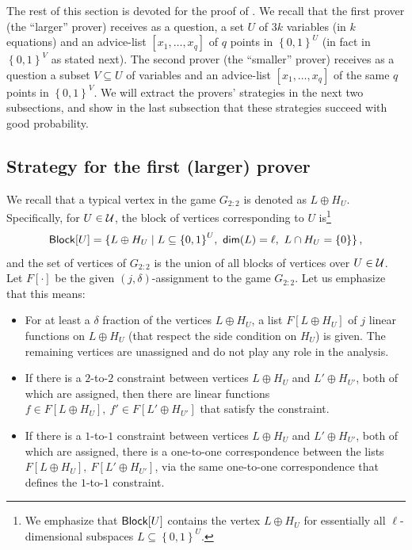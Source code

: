 \documentclass{toc}
\newcommand\set[1]{{\left\{ #1 \right\}}}
\newcommand\power[1]{\set{0,1}^{#1}}
\newcommand*\xor{\mathbin{\oplus}}
\begin{document}
The rest of this section is devoted for the proof of .
We recall that the first prover (the ``larger'' prover) receives as a question, a set $U$ of $3k$ variables (in $k$ equations) and an advice-list
$[x_1, \ldots, x_q]$ of $q$ points in $\power{U}$ (in fact in $\power{V}$ as stated next). The second prover (the ``smaller'' prover) receives as a question a subset
$V \subseteq U$ of variables and an advice-list $[x_1, \ldots, x_q]$ of the same $q$ points in $\power{V}$. We will extract the provers' strategies in
the next two subsections, and show in the last subsection that these strategies succeed with good probability.





\subsection{Strategy for the first (larger) prover }
We recall that a typical vertex in the game $G_{2:2}$ is denoted as $L\xor H_U$. Specifically, for $U \in {\cal U}$, the block of
vertices corresponding to $U$ is\footnote{We emphasize that ${\sf Block}[U]$ contains the vertex $L\xor H_U$ for essentially all
$\ell$-dimensional subspaces $L \subseteq \power{U}$.} 
 $$ {\sf Block}[U] = \{ L \xor H_U \mid L \subseteq \power{U}, ~{\sf dim}(L)=\ell, ~L \cap H_U = \{0\} \}\,,$$%
 and the set of vertices of $G_{2:2}$ is the union of all blocks of vertices over $U \in {\cal U}$. Let $F[\cdot]$ be the
 given $(j,\delta)$-assignment to the game $G_{2:2}$. Let us emphasize that this means:
 \begin{itemize}
 \item For at least
 a %
 $\delta$ fraction of the vertices $L \xor H_U$, a
 list $F[L\xor H_U]$ of $j$ linear functions on $L\xor H_U$ (that respect the side condition on $H_U$) is given. The remaining vertices
 are unassigned and do not play any role in the analysis.
 \item If there is a $2$-to-$2$ constraint between vertices $L\xor H_U$ and $L'\xor H_{U'}$, both of which are assigned, then there are linear functions
       $f \in F[L\xor H_U], ~f' \in F[L' \xor H_{U'}]$ that satisfy the constraint.
\item If there is a $1$-to-$1$ constraint between vertices $L\xor H_U$ and $L'\xor H_{U'}$, both of which are assigned, there is a one-to-one correspondence
      between the lists $F[L\xor H_U], ~F[L'\xor H_{U'}]$, via the same one-to-one correspondence that defines the $1$-to-$1$ constraint.
\end{itemize}
\end{document}
